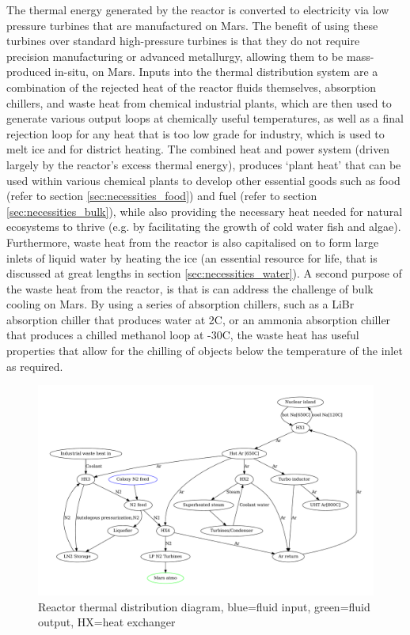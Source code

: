 \documentclass[fleqn,10pt]{Stylesheet} %
\begin{document}
The thermal energy generated by the reactor is converted to electricity via low pressure turbines that are manufactured on Mars. The benefit of using these turbines over standard high-pressure turbines is that they do not require precision manufacturing or advanced metallurgy, allowing them to be mass-produced in-situ, on Mars. Inputs into the thermal distribution system are a combination of the rejected heat of the reactor fluids themselves, absorption chillers, and waste heat from chemical industrial plants, which are then used to generate various output loops at chemically useful temperatures, as well as a final rejection loop for any heat that is too low grade for industry, which is used to melt ice and for district heating. The combined heat and power system (driven largely by the reactor’s excess thermal energy), produces ‘plant heat’ that can be used within various chemical plants to develop other essential goods such as food (refer to section \ref{sec:necessities_food}) and fuel (refer to section \ref{sec:necessities_bulk}), while also providing the necessary heat needed for natural ecosystems to thrive (e.g. by facilitating the growth of cold water fish and algae). Furthermore, waste heat from the reactor is also capitalised on to form large inlets of liquid water by heating the ice (an essential resource for life, that is discussed at great lengths in section \ref{sec:necessities_water}). A second purpose of the waste heat from the reactor, is that is can address the challenge of bulk cooling on Mars. By using a series of absorption chillers, such as a LiBr absorption chiller that produces water at 2\degree{}C, or an ammonia absorption chiller that produces a chilled methanol loop at -30\degree{}C, the waste heat has useful properties that allow for the chilling of objects below the temperature of the inlet as required.

\begin{figure}
    \centering
    \includegraphics[width=\linewidth]{figures/fig_power.pdf}
    \caption{Reactor thermal distribution diagram, blue=fluid input, green=fluid output, HX=heat exchanger}
    \label{fig:power_diagram}
\end{figure}
\end{document}

